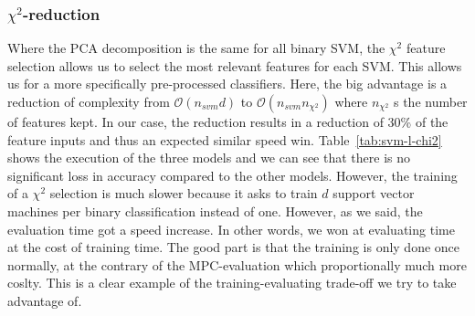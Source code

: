 \subsubsection{$\chi^2$-reduction}
Where the PCA decomposition is the same for all binary SVM, the $\chi^2$ feature selection allows us to select the most relevant features for each SVM. This allows us for a more specifically pre-processed classifiers. Here, the big advantage is a reduction of complexity from $\mathcal{O}(n_{svm}d)$ to $\mathcal{O}(n_{svm}n_{\chi^2})$ where $n_{\chi^2}$ s the number of features kept. In our case, the reduction results in a reduction of 30\% of the feature inputs and thus an expected similar speed win. Table~\ref{tab:svm-l-chi2} shows the execution of the three models and we can see that there is no significant loss in accuracy compared to the other models. However, the training of a $\chi^2$ selection is much slower because it asks to train $d$ support vector machines per binary classification instead of one. However, as we said, the evaluation time got a speed increase. In other words, we won at evaluating time at the cost of training time. The good part is that the training is only done once normally, at the contrary of the MPC-evaluation which proportionally much more coslty. This is a clear example of the training-evaluating trade-off we try to take advantage of.


